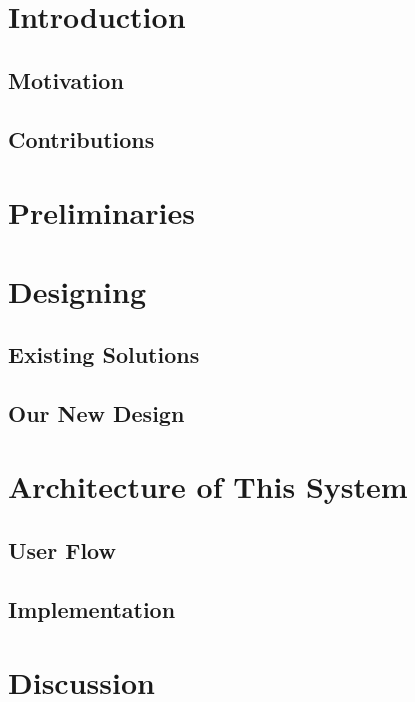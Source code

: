 %
%

\begin{CJK}{Bg5}{bsmi}
\chapter{Introduction}

\section{Motivation}

\section{Contributions}

\chapter{Preliminaries}

\chapter{Designing}

\section{Existing Solutions}

\section{Our New Design}

\chapter{Architecture of This System}

\section{User Flow}

\section{Implementation}

\chapter{Discussion}


\end{CJK}
